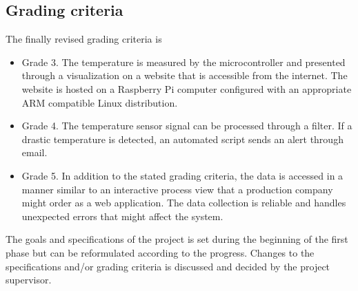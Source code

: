 \subsection{Grading criteria}%
\label{sub:grading_criteria}
The finally revised grading criteria is
\begin{itemize}
  \item 
    Grade 3. The temperature is measured by the microcontroller and presented through a visualization on a website that is accessible from the internet. The website is hosted on a Raspberry Pi computer configured with an appropriate ARM compatible Linux distribution.
  \item 
   Grade 4. The temperature sensor signal can be processed through a filter. If a drastic temperature is detected, an automated script sends an alert through email. 
  \item
   Grade 5. In addition to the stated grading criteria, the data is accessed in a manner similar to an interactive process view that a production company might order as a web application. The data collection is reliable and handles unexpected errors that might affect the system.
\end{itemize}

The goals and specifications of the project is set during the beginning of the first phase but can be reformulated according to the progress. Changes to the specifications and/or grading criteria is discussed and decided by the project supervisor.
